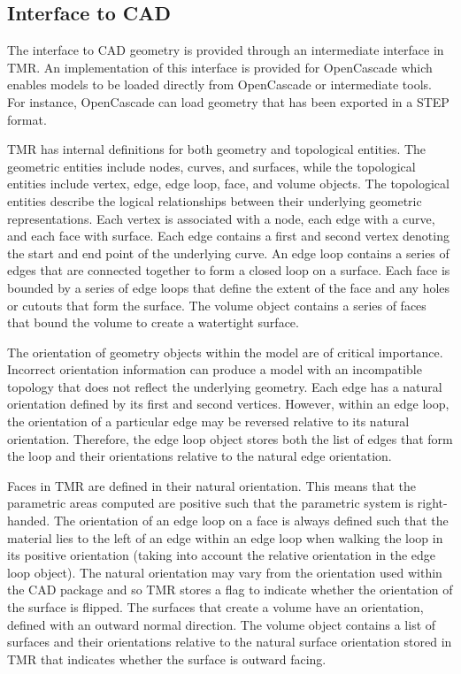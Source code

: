 \documentclass[12pt]{article}
\begin{document}
\subsection{Interface to CAD}

The interface to CAD geometry is provided through an intermediate interface in TMR. 
An implementation of this interface is provided for OpenCascade which enables models to be loaded directly from OpenCascade or intermediate tools. 
For instance, OpenCascade can load geometry that has been exported in a STEP format. 

TMR has internal definitions for both geometry and topological entities.
The geometric entities include nodes, curves, and surfaces, while the topological entities include vertex, edge, edge loop, face, and volume objects.
The topological entities describe the logical relationships between their underlying geometric representations.
Each vertex is associated with a node, each edge with a curve, and each face with surface.
Each edge contains a first and second vertex denoting the start and end point of the underlying curve.
An edge loop contains a series of edges that are connected together to form a closed loop on a surface.
Each face is bounded by a series of edge loops that define the extent of the face and any holes or cutouts that form the surface.
The volume object contains a series of faces that bound the volume to create a watertight surface.

The orientation of geometry objects within the model are of critical importance.
Incorrect orientation information can produce a model with an incompatible topology that does not reflect the underlying geometry.
Each edge has a natural orientation defined by its first and second vertices.
However, within an edge loop, the orientation of a particular edge may be reversed relative to its natural orientation. 
Therefore, the edge loop object stores both the list of edges that form the loop and their orientations relative to the natural edge orientation.

Faces in TMR are defined in their natural orientation.
This means that the parametric areas computed are positive such that the parametric system is right-handed.
The orientation of an edge loop on a face is always defined such that the material lies to the left of an edge within an edge loop when walking the loop in its positive orientation (taking into account the relative orientation in the edge loop object). 
The natural orientation may vary from the orientation used within the CAD package and so TMR stores a flag to indicate whether the orientation of the surface is flipped.
The surfaces that create a volume have an orientation, defined with an outward normal direction.
The volume object contains a list of surfaces and their orientations relative to the natural surface orientation stored in TMR that indicates whether the surface is outward facing.
\end{document}
